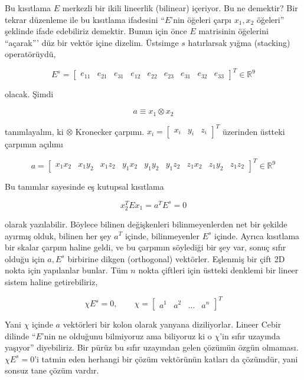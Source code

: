 \documentclass[12pt,fleqn]{article}\usepackage{../../common}
\begin{document}
Bu kısıtlama $E$ merkezli bir ikili lineerlik (bilinear) içeriyor. Bu ne
demektir? Bir tekrar düzenleme ile bu kısıtlama ifadesini ``$E$'nin öğeleri
çarpı $x_1,x_2$ öğeleri'' şeklinde ifade edebiliriz demektir. Bunun için önce
$E$ matrisinin öğelerini ``açarak''' düz bir vektör içine dizelim. Üstsimge $s$
hatırlarsak yığma (stacking) operatörüydü,

$$
E^s =\left[\begin{array}{ccccccccc}
e_{11} & e_{21} & e_{31} & e_{12} & e_{22} & e_{23} & e_{31} & e_{32} &
e_{33} \end{array}\right]^T \in \mathbb{R}^9
$$

olacak. Şimdi

$$ a \equiv x_1 \otimes x_2 $$

tanımlayalım, ki $\otimes$ Kronecker çarpımı. $x_i = \left[\begin{array}{ccc}
    x_i & y_i & z_i \end{array}\right]^T$ üzerinden üstteki çarpımın açılımı

$$ a = \left[\begin{array}{ccccccccc} 
x_1x_2 & 
x_1y_2 & 
x_1z_2 & 
y_1x_2 & 
y_1y_2 & 
y_1z_2 & 
z_1x_2 & 
z_1y_2 & 
z_1z_2 
\end{array}\right]^T \in \mathbb{R}^9 $$

Bu tanımlar sayesinde eş kutupsal kısıtlama

$$ x_2^TEx_1 = a^TE^s = 0 $$

olarak yazılabilir. Böylece bilinen değişkenleri bilinmeyenlerden net bir
şekilde ayırmış olduk, bilinen her şey $a^T$ içinde, bilinmeyenler $E^s$
içinde. Ayrıca kısıtlama bir skalar çarpım haline geldi, ve bu çarpımın
söylediği bir şey var, sonuç sıfır olduğu için $a,E^s$ birbirine dikgen
(orthogonal) vektörler. Eşlenmiş bir çift 2D nokta için yapılanlar bunlar. Tüm
$n$ nokta çiftleri için üstteki denklemi bir lineer sistem haline getirebiliriz,

$$
\chi E^s = 0, \qquad \chi =
\left[\begin{array}{cccc} a^1 & a^2 & \dots & a^n \end{array}\right]^T
$$

Yani $\chi$ içinde $a$ vektörleri bir kolon olarak yanyana diziliyorlar. Lineer
Cebir dilinde ``$E$'nin ne olduğunu bilmiyoruz ama biliyoruz ki o $\chi$'in
sıfır uzayında yaşıyor'' diyebiliriz. Bir pürüz bu sıfır uzayından gelen çözümün
özgün olmaması.  $\chi E^s = 0$'i tatmin eden herhangi bir çözüm vektörünün
katları da çözümdür, yani sonsuz tane çözüm vardır.
\end{document}
